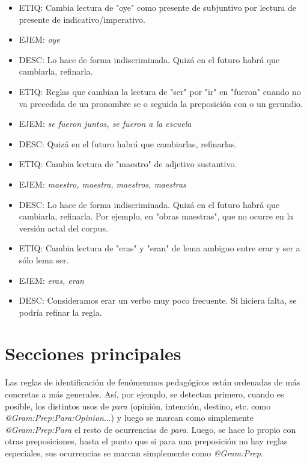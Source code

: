 \documentclass[11pt]{report}
\begin{document}
\begin{itemize}
\item ETIQ: Cambia lectura de "oye" como presente de subjuntivo por lectura de presente de indicativo/imperativo.
\item EJEM: \emph{oye} 
\item DESC: Lo hace de forma indiscriminada. Quizá en el futuro habrá que cambiarla, refinarla.
\end{itemize}

\begin{itemize}
\item ETIQ: Reglas que cambian la lectura de "ser" por "ir" en "fueron" cuando no va precedida de un pronombre se o seguida la preposición con o un gerundio.
\item EJEM: \emph{se fueron juntos, se fueron a la escuela} 
\item DESC: Quizá en el futuro habrá que cambiarlas, refinarlas.
\end{itemize}

\begin{itemize}
\item ETIQ: Cambia lectura de "maestro" de adjetivo sustantivo.
\item EJEM: \emph{maestro, maestra, maestros, maestras} 
\item DESC: Lo hace de forma indiscriminada. Quizá en el futuro habrá que cambiarla, refinarla. Por ejemplo, en "obras maestras", que no ocurre en la versión actal del corpus.
\end{itemize}

\begin{itemize}
\item ETIQ: Cambia lectura de "eras" y "eran" de lema ambiguo entre erar y ser a sólo lema ser.
\item EJEM: \emph{eras, eran} 
\item DESC: Consideramos erar un verbo muy poco frecuente. Si hiciera falta, se podría refinar la regla.
\end{itemize}

\part{Secciones principales}
Las reglas de identificación de fenómenmos pedagógicos están ordenadas de más concretas a más generales. Así, por ejemplo, se detectan primero, cuando es posible, los distintos usos de \emph{para} (opinión, intención, destino, etc. como \emph{@Gram:Prep:Para:Opinion}...) y luego se marcan como simplemente \emph{@Gram:Prep:Para} el resto de ocurrencias de \emph{para}. Luego, se hace lo propio con otras preposiciones, hasta el punto que si para una preposición no hay reglas especiales, sus ocurrencias se marcan simplemente como \emph{@Gram:Prep}.
\end{document}
